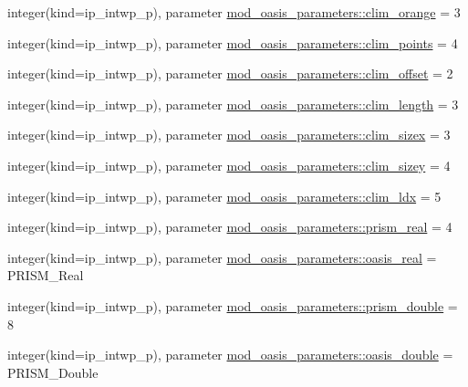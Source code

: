 \begin{DoxyCompactItemize}
\item 
integer(kind=ip\+\_\+intwp\+\_\+p), parameter \hyperlink{namespacemod__oasis__parameters_a17c74cc8141b595e448588b1add0f6bf}{mod\+\_\+oasis\+\_\+parameters\+::clim\+\_\+orange} = 3
\item 
integer(kind=ip\+\_\+intwp\+\_\+p), parameter \hyperlink{namespacemod__oasis__parameters_aa9d90a3d7d5b21d2081a578dfea42fd4}{mod\+\_\+oasis\+\_\+parameters\+::clim\+\_\+points} = 4
\item 
integer(kind=ip\+\_\+intwp\+\_\+p), parameter \hyperlink{namespacemod__oasis__parameters_a4cd07733eaf5d8c8148986c0c4217772}{mod\+\_\+oasis\+\_\+parameters\+::clim\+\_\+offset} = 2
\item 
integer(kind=ip\+\_\+intwp\+\_\+p), parameter \hyperlink{namespacemod__oasis__parameters_a984896e821cbbb8c4a91e86ff19d54de}{mod\+\_\+oasis\+\_\+parameters\+::clim\+\_\+length} = 3
\item 
integer(kind=ip\+\_\+intwp\+\_\+p), parameter \hyperlink{namespacemod__oasis__parameters_a4fb35a666ab4cec927a2ae9244535cb0}{mod\+\_\+oasis\+\_\+parameters\+::clim\+\_\+sizex} = 3
\item 
integer(kind=ip\+\_\+intwp\+\_\+p), parameter \hyperlink{namespacemod__oasis__parameters_a206910560c246db3404224a04cfd4319}{mod\+\_\+oasis\+\_\+parameters\+::clim\+\_\+sizey} = 4
\item 
integer(kind=ip\+\_\+intwp\+\_\+p), parameter \hyperlink{namespacemod__oasis__parameters_a3407c11054d24782182c649307808e47}{mod\+\_\+oasis\+\_\+parameters\+::clim\+\_\+ldx} = 5
\item 
integer(kind=ip\+\_\+intwp\+\_\+p), parameter \hyperlink{namespacemod__oasis__parameters_a02e0627219e7769df37e3d55da46f65d}{mod\+\_\+oasis\+\_\+parameters\+::prism\+\_\+real} = 4
\item 
integer(kind=ip\+\_\+intwp\+\_\+p), parameter \hyperlink{namespacemod__oasis__parameters_ae7760fcfae19d2f3cbf759688cd35193}{mod\+\_\+oasis\+\_\+parameters\+::oasis\+\_\+real} = P\+R\+I\+S\+M\+\_\+\+Real
\item 
integer(kind=ip\+\_\+intwp\+\_\+p), parameter \hyperlink{namespacemod__oasis__parameters_a9527d2d640ea7d747143bf994ee9b206}{mod\+\_\+oasis\+\_\+parameters\+::prism\+\_\+double} = 8
\item 
integer(kind=ip\+\_\+intwp\+\_\+p), parameter \hyperlink{namespacemod__oasis__parameters_a1071adbbf4c378907b4ff69dd53d0d7e}{mod\+\_\+oasis\+\_\+parameters\+::oasis\+\_\+double} = P\+R\+I\+S\+M\+\_\+\+Double
\end{DoxyCompactItemize}
